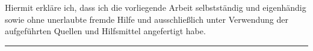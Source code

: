 Hiermit erkläre ich, dass ich die vorliegende Arbeit selbstständig und eigenhändig sowie ohne unerlaubte fremde Hilfe und ausschließlich unter Verwendung der aufgeführten Quellen und Hilfsmittel angefertigt habe. \\

\begin{minipage}{0.5\textwidth}
	\Datum
    \vspace{2.0cm}\hrule\smallskip
    \small{\Autor}
\end{minipage}
